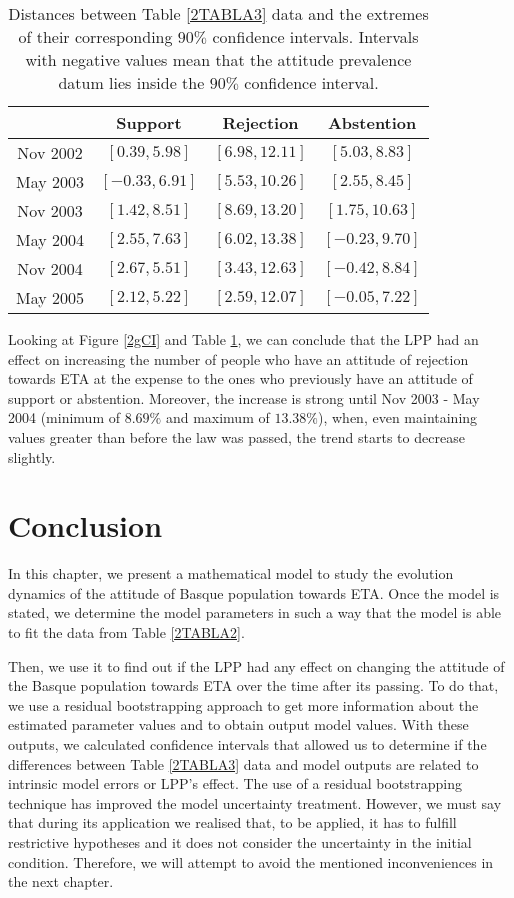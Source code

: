 \begin{table}[ht]
\centering
\begin{tabular}{|c|ccc|}
\hline
 & Support & Rejection & Abstention \\ 
\hline
Nov 2002	& $[	0.39	,	5.98	]$ & $[	6.98	,	12.11	]$ & $[	5.03	,	8.83	]$ \\
May 2003	& $[	-0.33,	6.91	]$ & $[	5.53	,	10.26	]$ & $[	2.55	,	8.45	]$ \\
Nov 2003	& $[	1.42	,	8.51	]$ & $[	8.69	,	13.20	]$ & $[	1.75	,	10.63	]$ \\
May 2004	& $[	2.55	,	7.63	]$ & $[	6.02	,	13.38	]$ & $[	-0.23,	9.70	]$ \\
Nov 2004	& $[	2.67	,	5.51	]$ & $[	3.43	,	12.63	]$ & $[	-0.42,	8.84	]$ \\
May 2005	& $[	2.12	,	5.22	]$ & $[	2.59	,	12.07	]$ & $[	-0.05,	7.22	]$ \\
\hline 
\end{tabular}
\caption{Distances between Table \ref{2TABLA3} data and the extremes of their corresponding $90\%$ confidence intervals. Intervals with negative values mean that the attitude prevalence datum lies inside the $90\%$ confidence interval.}
\label{2TABLAEfecto} 
\end{table}

Looking at Figure \ref{2gCI} and Table \ref{2TABLAEfecto}, we can conclude that the LPP had an effect on increasing the number of people who have an attitude of rejection towards ETA at the expense to the ones who previously have an attitude of support or abstention. Moreover, the increase is strong until Nov 2003 - May 2004 (minimum of $8.69\%$ and maximum of $13.38\%$), when, even maintaining values greater than before the law was passed, the trend starts to decrease slightly. 

\section{Conclusion}\label{2.5}  
In this chapter, we present a mathematical model to study the evolution dynamics of the attitude of Basque population towards ETA. Once the model is stated, we determine the model parameters in such a way that the model is able to fit the data from Table \ref{2TABLA2}. 

Then, we use it to find out if the LPP had any effect on changing the attitude of the Basque population towards ETA over the time after its passing. To do that, we use a residual bootstrapping approach to get more information about the estimated parameter values and to obtain output model values. With these outputs, we calculated confidence intervals that allowed us to determine if the differences between Table \ref{2TABLA3} data and model outputs are related to intrinsic model errors or LPP's effect. The use of a residual bootstrapping technique has improved the model uncertainty treatment. However, we must say that during its application we realised that, to be applied, it has to fulfill restrictive hypotheses and it does not consider the uncertainty in the initial condition. Therefore, we will attempt to avoid the mentioned inconveniences in the next chapter.

